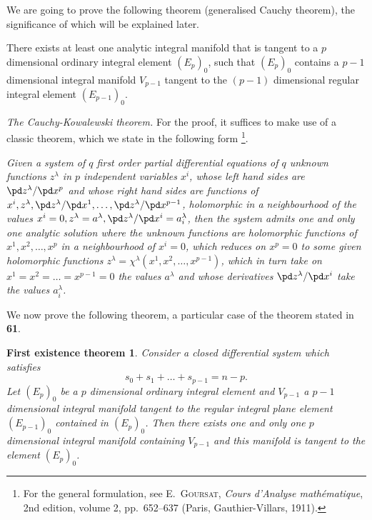 We are going to prove the following theorem (generalised Cauchy theorem), the significance of which will be explained later.
\begin{thm*}
  There exists at least one analytic integral manifold that is tangent to a $p$ dimensional ordinary integral element $(E_{p})_{0}$, such that $(E_{p})_{0}$ contains a $p-1$ dimensional integral manifold $V_{p-1}$ tangent to the $(p-1)$ dimensional  regular integral element $(E_{p-1})_{0}$.
\end{thm*}


\vspace{12pt}\fsec \emph{The Cauchy-Kowalewski theorem.} For the proof, it suffices to make use of a classic theorem, which we state in the following form \footnote{For the general formulation, see \textsc{E.~Goursat}, \emph{Cours d'Analyse math\'ematique}, 2nd edition, volume 2, pp.~652--637 (Paris, Gauthier-Villars, 1911).}.

\emph{Given a system of $q$ first order partial differential equations of $q$ unknown functions $z^{\lambda}$ in $p$ independent variables $x^{i}$, whose left hand sides are $\pd z^{\lambda}/\pd x^{p}$ and whose right hand sides are  functions of $x^{i},z^{\lambda},\pd z^{\lambda}/\pd x^{1},\dots,\pd z^{\lambda}/\pd x^{p-1}$, holomorphic in a neighbourhood of the values $x^{i}=0,z^{\lambda}=a^{\lambda},\pd z^{\lambda}/\pd x^{i}=a^{\lambda}_{i}$, then the system admits one and only one analytic solution where the unknown functions are holomorphic functions of $x^{1},x^{2},\dots,x^{p}$ in a neighbourhood of $x^{i}=0$, which reduces on $x^{p}=0$ to some given holomorphic functions $z^{\lambda}=\chi^{\lambda}(x^{1},x^{2},\dots,x^{p-1})$, which in turn take on $x^{1}=x^{2}=\dots=x^{p-1}=0$ the values $a^{\lambda}$ and whose derivatives $\pd z^{\lambda}/\pd x^{i}$ take the values $a^{\lambda}_{i}$.}


\vspace{12pt}\fsec We now prove the following theorem,  a particular case of the theorem stated in \textsection\textbf{61}.

\newtheorem*{thmexs1}{\hspace{15pt}First existence theorem}
\begin{thmexs1}
  Consider a closed differential system which satisfies
\[
s_{0}+s_{1}+\dots+s_{p-1}=n-p.
\]
Let $(E_{p})_{0}$ be a $p$ dimensional ordinary integral element and $V_{p-1}$ a $p-1$ dimensional integral manifold tangent to the regular integral plane element $(E_{p-1})_{0}$ contained in $(E_{p})_{0}$. Then there exists one and only one $p$ dimensional integral manifold containing $V_{p-1}$ and this manifold is tangent to the element $(E_{p})_{0}$.
\end{thmexs1}

